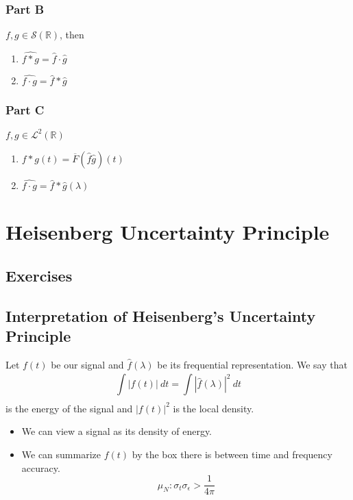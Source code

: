 \subsubsection{Part B}
$ f, g \in \mathscr{ S } \left( \mathbb{R}\right)  $, then 
\begin{enumerate}
    \item $\widehat{f*g} = \widehat{f}\cdot\widehat{g} $
    \item $\widehat{f\cdot g} = \widehat{f} * \widehat{g}$
\end{enumerate}

\subsubsection{Part C}
$ f,g \in \mathscr{L}^2(\mathbb{R})  $
\begin{enumerate}
    \item $f * g(t) = \overline{F}\left( \widehat{f} \widehat{g}\right) (t) $
    \item $ \widehat{f\cdot g} = \widehat{f} * \widehat{g} (\lambda) $
\end{enumerate}


\section{Heisenberg Uncertainty Principle}
\label{sec:Heisenberg Uncertainty Principle}
\subsection{Exercises}
\label{subsec:Exercises}

\subsection{Interpretation of Heisenberg's Uncertainty Principle}
\label{subsec:Interpretation of Heisenberg's Uncertainty Principle}
Let $ f(t)  $ be our signal and $ \widehat{f}(\lambda) $ be its frequential
representation. We say that 
\[
    \int\limits_{ }^{ } \left | f(t) \right | \ dt = \int\limits_{ }^{ } \left |
    \widehat{f}(\lambda) \right |^2 \ dt
\] is the energy of the signal and $ \left | f(t)  \right | ^2 $ is the local density. 
\begin{itemize}
  \item We can view a signal as its density of energy. 
  \item We can summarize $ f(t)  $ by the box there is between time and frequency
      accuracy. 
      \[
          \mu_N : \sigma_t\sigma_{\epsilon} > \frac{ 1 }{ 4\pi } 
      \]
\end{itemize}

